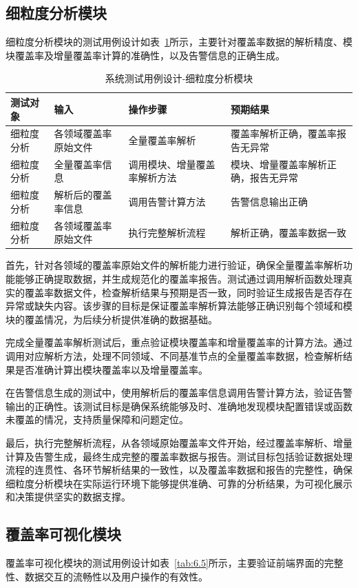 \subsection{细粒度分析模块}
细粒度分析模块的测试用例设计如表~\ref{tab:6.4}所示，主要针对覆盖率数据的解析精度、模块覆盖率及增量覆盖率计算的准确性，以及告警信息的正确生成。

\begin{table}[ht]
\centering
\caption{系统测试用例设计-细粒度分析模块}
\label{tab:6.4}
\begin{tabular}{p{2cm}p{2.5cm}p{4cm}p{4cm}}
\toprule
\textbf{测试对象} & \textbf{输入} & \textbf{操作步骤} & \textbf{预期结果} \\
\midrule
细粒度分析 & 各领域覆盖率原始文件 & 全量覆盖率解析 & 覆盖率解析正确，覆盖率报告无异常 \\
细粒度分析 & 全量覆盖率信息 & 调用模块、增量覆盖率解析方法 & 模块、增量覆盖率解析正确，报告无异常 \\
细粒度分析 & 解析后的覆盖率信息 & 调用告警计算方法 & 告警信息输出正确 \\
细粒度分析 & 各领域覆盖率原始文件 & 执行完整解析流程 & 解析正确，覆盖率数据一致 \\
\bottomrule
\end{tabular}
\end{table}

首先，针对各领域的覆盖率原始文件的解析能力进行验证，确保全量覆盖率解析功能能够正确提取数据，并生成规范化的覆盖率报告。测试通过调用解析函数处理真实的覆盖率数据文件，检查解析结果与预期是否一致，同时验证生成报告是否存在异常或缺失内容。该步骤的目标是保证覆盖率解析算法能够正确识别每个领域和模块的覆盖情况，为后续分析提供准确的数据基础。

完成全量覆盖率解析测试后，重点验证模块覆盖率和增量覆盖率的计算方法。通过调用对应解析方法，处理不同领域、不同基准节点的全量覆盖率数据，检查解析结果是否准确计算出模块覆盖率以及增量覆盖率。

在告警信息生成的测试中，使用解析后的覆盖率信息调用告警计算方法，验证告警输出的正确性。该测试目标是确保系统能够及时、准确地发现模块配置错误或函数未覆盖的情况，支持质量保障和问题定位。

最后，执行完整解析流程，从各领域原始覆盖率文件开始，经过覆盖率解析、增量计算及告警生成，最终生成完整的覆盖率数据与报告。测试目标包括验证数据处理流程的连贯性、各环节解析结果的一致性，以及覆盖率数据和报告的完整性，确保细粒度分析模块在实际运行环境下能够提供准确、可靠的分析结果，为可视化展示和决策提供坚实的数据支撑。

\subsection{覆盖率可视化模块}
覆盖率可视化模块的测试用例设计如表~\ref{tab:6.5}所示，主要验证前端界面的完整性、数据交互的流畅性以及用户操作的有效性。

